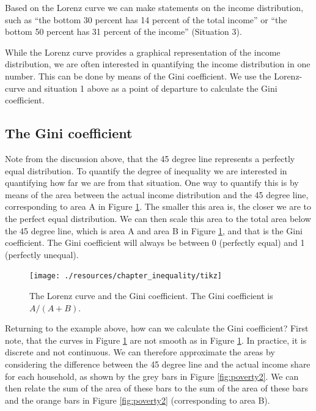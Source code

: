 \documentclass[
]{book}
\begin{document}
Based on the Lorenz curve we can make statements on the income distribution, such as ``the bottom 30 percent has 14 percent of the total income'' or ``the bottom 50 percent has 31 percent of the income'' (Situation 3).

While the Lorenz curve provides a graphical representation of the income distribution, we are often interested in quantifying the income distribution in one number. This can be done by means of the Gini coefficient. We use the Lorenz-curve and situation 1 above as a point of departure to calculate the Gini coefficient.

\hypertarget{the-gini-coefficient}{%
\subsection*{The Gini coefficient}\label{the-gini-coefficient}}

Note from the discussion above, that the 45 degree line represents a perfectly equal distribution. To quantify the degree of inequality we are interested in quantifying how far we are from that situation. One way to quantify this is by means of the area between the actual income distribution and the 45 degree line, corresponding to area A in Figure \ref{fig:poverty1}. The smaller this area is, the closer we are to the perfect equal distribution. We can then scale this area to the total area below the 45 degree line, which is area A and area B in Figure \ref{fig:poverty1}, and that is the Gini coefficient. The Gini coefficient will always be between 0 (perfectly equal) and 1 (perfectly unequal).

\begin{figure}

{\centering \texttt{[image: ./resources/chapter\_inequality/tikz]} 

}

\caption{The Lorenz curve and the Gini coefficient. The Gini coefficient is $A/(A+B)$.}\label{fig:poverty1}
\end{figure}

Returning to the example above, how can we calculate the Gini coefficient? First note, that the curves in Figure \ref{fig:poverty1} are not smooth as in Figure \ref{fig:poverty1}. In practice, it is discrete and not continuous. We can therefore approximate the areas by considering the difference between the 45 degree line and the actual income share for each household, as shown by the grey bars in Figure \ref{fig:poverty2}. We can then relate the sum of the area of these bars to the sum of the area of these bars and the orange bars in Figure \ref{fig:poverty2} (corresponding to area B).
\end{document}
